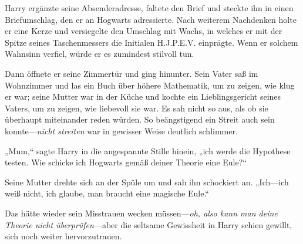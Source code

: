 Harry ergänzte seine Absenderadresse, faltete den Brief und steckte ihn in einen Briefumschlag, den er an Hogwarts adressierte. Nach weiterem Nachdenken holte er eine Kerze und versiegelte den Umschlag mit Wachs, in welches er mit der Spitze seines Taschenmessers die Initialen H.J.P.E.V. einprägte. Wenn er solchem Wahnsinn verfiel, würde er es zumindest stilvoll tun.

Dann öffnete er seine Zimmertür und ging hinunter. Sein Vater saß im Wohnzimmer und las ein Buch über höhere Mathematik, um zu zeigen, wie klug er war; seine Mutter war in der Küche und kochte ein Lieblingsgericht seines Vaters, um zu zeigen, wie liebevoll sie war. Es sah nicht so aus, als ob sie überhaupt miteinander reden würden. So beängstigend ein Streit auch sein konnte—\emph{nicht streiten} war in gewisser Weise deutlich schlimmer.

„Mum,“ sagte Harry in die angespannte Stille hinein, „ich werde die Hypothese testen. Wie schicke ich Hogwarts gemäß deiner Theorie eine Eule?“

Seine Mutter drehte sich an der Spüle um und sah ihn schockiert an. „Ich—ich weiß nicht, ich glaube, man braucht eine magische Eule.“

Das hätte wieder sein Misstrauen wecken müssen—\emph{oh, also kann man deine Theorie nicht überprüfen}—aber die seltsame Gewissheit in Harry schien gewillt, sich noch weiter hervorzutrauen.

